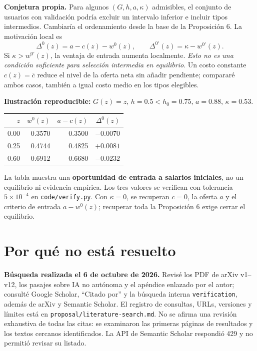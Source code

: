 \documentclass[11pt]{article}
\begin{document}
\textbf{Conjetura propia.} Para algunos $(G,h,a,\kappa)$ admisibles, el conjunto de usuarios con validación podría excluir un intervalo inferior e incluir tipos intermedios. Cambiaría el ordenamiento desde la base de la Proposición 6. La motivación local es
\begin{equation}
\Delta^0(z)=a-c(z)-w^0(z),\qquad
\Delta^{0\prime}(z)=\kappa-w^{0\prime}(z).
\end{equation}
Si $\kappa>w^{0\prime}(z)$, la ventaja de entrada aumenta localmente. \emph{Esto no es una condición suficiente para selección intermedia en equilibrio}. Un costo constante $c(z)=\bar c$ reduce el nivel de la oferta neta sin añadir pendiente; compararé ambos casos, también a igual costo medio en los tipos elegibles.

\textbf{Ilustración reproducible:} $G(z)=z$, $h=0.5<h_0=0.75$, $a=0.88$, $\kappa=0.53$.
\begin{center}
\begin{tabular}{rrrr}\toprule
$z$ & $w^0(z)$ & $a-c(z)$ & $\Delta^0(z)$\\\midrule
0.00 & 0.3570 & 0.3500 & $-0.0070$\\
0.25 & 0.4744 & 0.4825 & $+0.0081$\\
0.60 & 0.6912 & 0.6680 & $-0.0232$\\\bottomrule
\end{tabular}
\end{center}
La tabla muestra una \textbf{oportunidad de entrada a salarios iniciales}, no un equilibrio ni evidencia empírica. Los tres valores se verifican con tolerancia $5\times10^{-4}$ en \texttt{code/verify.py}. Con $\kappa=0$, se recuperan $c=0$, la oferta $a$ y el criterio de entrada $a-w^0(z)$; recuperar toda la Proposición 6 exige cerrar el equilibrio.
\newpage
\section{Por qué no está resuelto}
\textbf{Búsqueda realizada el 6 de octubre de 2026.} Revisé los PDF de arXiv v1--v12, los pasajes sobre IA no autónoma y el apéndice enlazado por el autor; consulté Google Scholar, ``Citado por'' y la búsqueda interna \texttt{verification}, además de arXiv y Semantic Scholar. El registro de consultas, URLs, versiones y límites está en \texttt{proposal/literature-search.md}. No se afirma una revisión exhaustiva de todas las citas: se examinaron las primeras páginas de resultados y los textos cercanos identificados. La API de Semantic Scholar respondió 429 y no permitió revisar su listado.
\end{document}

